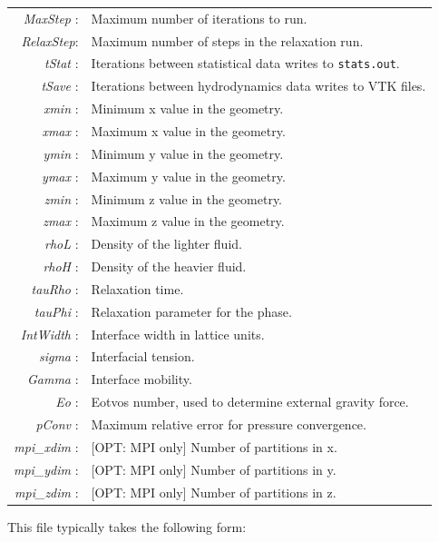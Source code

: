 \documentclass[12pt]{report}
\begin{document}
\begin{longtable}{rl}
\textit{MaxStep}  :& Maximum number of iterations to run.\\
\textit{RelaxStep}:& Maximum number of steps in the relaxation run.\\
\textit{tStat}    :& Iterations between statistical data writes to \verb+stats.out+.\\
\textit{tSave}    :& Iterations between hydrodynamics data writes to VTK files.\\
\textit{xmin}     :& Minimum x value in the geometry.\\
\textit{xmax}     :& Maximum x value in the geometry.\\
\textit{ymin}     :& Minimum y value in the geometry.\\
\textit{ymax}     :& Maximum y value in the geometry.\\
\textit{zmin}     :& Minimum z value in the geometry.\\
\textit{zmax}     :& Maximum z value in the geometry.\\
\textit{rhoL}     :& Density of the lighter fluid.\\
\textit{rhoH}     :& Density of the heavier fluid.\\
\textit{tauRho}   :& Relaxation time.\\
\textit{tauPhi}   :& Relaxation parameter for the phase.\\
\textit{IntWidth} :& Interface width in lattice units.\\
\textit{sigma}    :& Interfacial tension.\\
\textit{Gamma}    :& Interface mobility.\\
\textit{Eo}       :& Eotvos number, used to determine external gravity force.\\
\textit{pConv}    :& Maximum relative error for pressure convergence.\\
\textit{mpi\_xdim} :& [OPT: MPI only] Number of partitions in x.\\
\textit{mpi\_ydim} :& [OPT: MPI only] Number of partitions in y.\\
\textit{mpi\_zdim} :& [OPT: MPI only] Number of partitions in z.\\
\end{longtable}

This file typically takes the following form:
\end{document}
